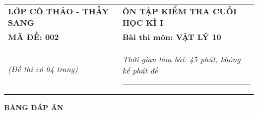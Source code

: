 \begin{center}
	\begin{tabular}{M{9.25cm}M{8.75cm}}
		\textbf{LỚP CÔ THẢO - THẦY SANG}& \textbf{ÔN TẬP KIỂM TRA CUỐI HỌC KÌ I}\\
		\textbf{MÃ ĐỀ: 002}& \textbf{Bài thi môn: VẬT LÝ 10}\\
		\textit{(Đề thi có 04 trang)}& \textit{Thời gian làm bài: 45 phút, không kể phát đề}
		
		\noindent\rule{4cm}{0.8pt} \\
	\end{tabular}
\end{center}
\setcounter{section}{0}
\begin{center}
	\textbf{\large BẢNG ĐÁP ÁN}
\end{center}
\section{}
\section{}
\section{}
